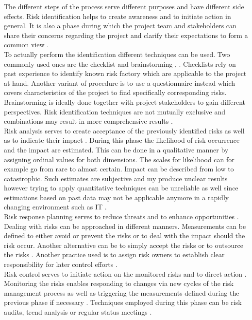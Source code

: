 The different steps of the process serve different purposes and have different side effects. Risk identification helps to create awareness and to initiate action in general. It is also a phase during which the project team and stakeholders can share their concerns regarding the project and clarify their expectations to form a common view \cite{didragaRoleEffectsRisk2013}.\\
To actually perform the identification different techniques can be used. Two commonly used ones are the checklist and brainstorming \cite{islamSoftwareDevelopmentRisk2011}, \cite{didragaRoleEffectsRisk2013}. Checklists rely on past experience to identify known risk factory which are applicable to the project at hand. Another variant of procedure is to use a questionnaire instead which covers characteristics of the project to find specifically corresponding risks. Brainstorming is ideally done together with project stakeholders to gain different perspectives. Risk identification techniques are not mutually exclusive and combinations may result in more comprehensive results \cite{islamSoftwareDevelopmentRisk2011}.\\
Risk analysis serves to create acceptance of the previously identified risks as well as to indicate their impact \cite{didragaRoleEffectsRisk2013}. During this phase the likelihood of risk occurrence and the impact are estimated. This can be done in a qualitative manner by assigning ordinal values for both dimensions. The scales for likelihood can for example go from rare to almost certain. Impact can be described from low to catastrophic. Such estimates are subjective and my produce unclear results however trying to apply quantitative techniques can be unreliable as well since estimations based on past data may not be applicable anymore in a rapidly changing environment such as IT \cite{islamSoftwareDevelopmentRisk2011}.\\
Risk response planning serves to reduce threats and to enhance opportunities \cite{teschITProjectRisk2007}. Dealing with risks can be approached in different manners. Measurements can be defined to either avoid or prevent the risks or to deal with the impact should the risk occur. Another alternative can be to simply accept the risks or to outsource the risks \cite{islamSoftwareDevelopmentRisk2011}. Another practice used is to assign risk owners to establish clear responsibility for later control efforts \cite{peixotoProjectRiskManagement2014}.\\
Risk control serves to initiate action on the monitored risks and to direct action \cite{islamSoftwareDevelopmentRisk2011}. Monitoring the risks enables responding to changes via new cycles of the risk management process as well as triggering the measurements defined during the previous phase if necessary \cite{teschITProjectRisk2007}.  Techniques employed during this phase can be risk audits, trend analysis or regular status meetings \cite{islamSoftwareDevelopmentRisk2011}.
